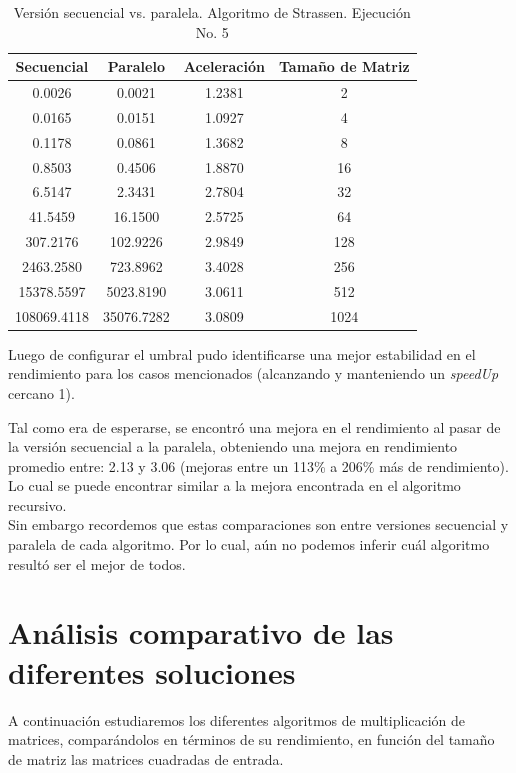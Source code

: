 \documentclass{article}
\begin{document}
\begin{table}[ht]
\centering
\begin{tabular}{|c|c|c|c|}
\hline
\textbf{Secuencial} & \textbf{Paralelo} & \textbf{Aceleración} & \textbf{Tamaño de Matriz} \\
\hline
0.0026 & 0.0021 & 1.2381 & 2 \\
0.0165 & 0.0151 & 1.0927 & 4 \\
0.1178 & 0.0861 & 1.3682 & 8 \\
0.8503 & 0.4506 & 1.8870 & 16 \\
6.5147 & 2.3431 & 2.7804 & 32 \\
41.5459 & 16.1500 & 2.5725 & 64 \\
307.2176 & 102.9226 & 2.9849 & 128 \\
2463.2580 & 723.8962 & 3.4028 & 256 \\
15378.5597 & 5023.8190 & 3.0611 & 512 \\
108069.4118 & 35076.7282 & 3.0809 & 1024 \\
\hline
\end{tabular}
\caption{Versión secuencial vs. paralela. Algoritmo de Strassen. Ejecución No. 5}
\end{table}


Luego de configurar el umbral pudo identificarse una mejor estabilidad en el rendimiento para los casos mencionados (alcanzando y manteniendo un \textit{speedUp} cercano 1).

Tal como era de esperarse, se encontró una mejora en el rendimiento al pasar de la versión secuencial a la paralela, obteniendo una mejora en rendimiento promedio entre: 2.13 y 3.06 (mejoras entre un 113\% a 206\% más de rendimiento). Lo cual se puede encontrar similar a la mejora encontrada en el algoritmo recursivo.\\

Sin embargo recordemos que estas comparaciones son entre versiones secuencial y paralela de cada algoritmo. Por lo cual, aún no podemos inferir cuál algoritmo resultó ser el mejor de todos.

\clearpage

\section{Análisis comparativo de las diferentes soluciones}

A continuación estudiaremos los diferentes algoritmos de multiplicación de matrices, comparándolos en términos de su rendimiento, en función del tamaño de matriz las matrices cuadradas de entrada. \\
\end{document}
